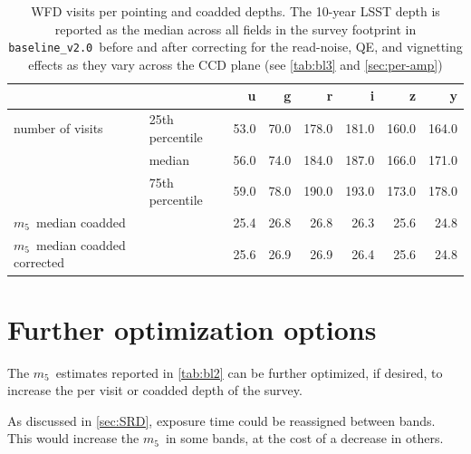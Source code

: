 \documentclass[PST,authoryear,toc]{lsstdoc}
\newcommand{\mf}{\ensuremath{m_5}}
\newcommand{\baseline}{\texttt{baseline\_v2.0}}
\begin{document}
\FloatBarrier

\begin{table}[h!]
\caption{WFD visits per pointing and coadded  depths. The 10-year LSST depth is reported as the median across all fields in the survey footprint in \baseline\ before and after correcting for the read-noise, QE, and vignetting effects as they vary across the CCD plane (see \autoref{tab:bl3} and  \autoref{sec:per-amp})}\label{tab:wfd_nvis}
\small
    \centering
\begin{tabular}{llrrrrrr}
\hline
{} & &    u &     g &      r &      i &      z &      y \\
\hline
number of visits &25th percentile &  53.0 &  70.0 &  178.0 &  181.0 &  160.0 &  164.0 \\
&   median       &  56.0 &  74.0 &  184.0 &  187.0 &  166.0 &  171.0 \\
& 75th percentile &  59.0 &  78.0 &  190.0 &  193.0 &  173.0 &  178.0 \\
\hline
\mf\ median coadded &         &  25.4 &  26.8 &   26.8 &   26.3 &   25.6 &   24.8 \\
\hline
\mf\ median coadded corrected&         &  25.6 &  26.9 &   26.9 &   26.4 &   25.6 &   24.8 \\
\end{tabular}
\end{table}

\FloatBarrier



\section{Further optimization options}\label{sec:optimize}

The \mf\ estimates reported in \autoref{tab:bl2} can be further optimized, if desired, to increase the per visit or coadded depth of the survey.



 As discussed in \autoref{sec:SRD}, exposure time could be reassigned between
bands. This would increase the \mf\ in some bands, at the cost of a decrease in others.
\end{document}
